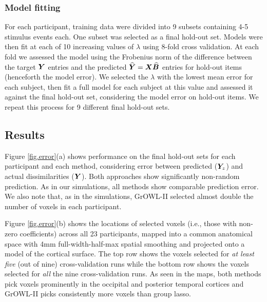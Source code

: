 \subsubsection*{Model fitting}
For each participant, training data were divided into 9 subsets containing 4-5 stimulus events each. One subset was selected as a final hold-out set. Models were then fit at each of 10 increasing values of $\lambda$ using 8-fold cross validation. At each fold we assessed the model using the Frobenius norm of the difference between the target $\boldsymbol{Y}$ entries and the predicted $\boldsymbol{\widehat{Y}} = \boldsymbol{X}\widehat{\boldsymbol{B}}$ entries for hold-out items (henceforth the model error). We selected the $\lambda$ with the lowest mean error for each subject, then fit a full model for each subject at this value and assessed it against the final hold-out set, considering the model error on hold-out items. We repeat this process for 9 different final hold-out sets.

\subsection{Results}
Figure \ref{fig.error}(a) shows performance on the final hold-out sets for each
participant and each method, considering error between predicted ($\boldsymbol{Y}_z$) and actual
dissimilarities ($\boldsymbol{Y}$). Both approaches show significantly non-random prediction. As in
our simulations, all methods show comparable prediction error. We also note that, as in
the simulations, GrOWL-II selected almost double the number of voxels in each
participant.

Figure \ref{fig.error}(b) shows the locations of selected voxels (i.e., those with
non-zero coefficients) across all 23 participants, mapped into a common anatomical space
with 4mm full-width-half-max spatial smoothing and projected onto a model of the cortical
surface. The top row shows the voxels selected for \textit{at least five} (out of nine)
cross-validation runs while the bottom row shows the voxels selected for \textit{all} the
nine cross-validation runs. As seen in the maps, both methods pick voxels prominently in
the occipital and posterior temporal cortices and GrOWL-II picks consistently more voxels
than group lasso.

